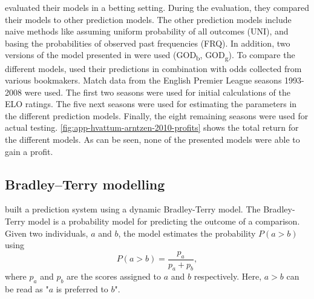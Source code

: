 \citet{bib:hvattum-arntzen-2010} evaluated their models in a betting setting. During the evaluation, they compared their models to other prediction models. The other prediction models include naive methods like assuming uniform probability of all outcomes (UNI), and basing the probabilities of observed past frequencies (FRQ). In addition, two versions of the model presented in \citet{bib:goddard-2005} were used (GOD\textsubscript{b}, GOD\textsubscript{g}). To compare the different models, \citet{bib:hvattum-arntzen-2010} used their predictions in combination with odds collected from various bookmakers. Match data from the English Premier League seasons 1993-2008 were used. The first two seasons were used for initial calculations of the ELO ratings. The five next seasons were used for estimating the parameters in the different prediction models. Finally, the eight remaining seasons were used for actual testing. \cref{fig:app-hvattum-arntzen-2010-profits} shows the total return for the different models. As can be seen, none of the presented models were able to gain a profit.

\subsection{Bradley–Terry modelling}

\citet{bib:cattelan-varin-firth-2013} built a prediction system using a dynamic Bradley-Terry model. The Bradley-Terry model is a probability model for predicting the outcome of a comparison. Given two individuals, $a$ and $b$, the model estimates the probability $P(a > b)$ using
\begin{equation}
    P(a > b) = \frac{p_{a}}{p_{a} + p_{b}},
    \label{eq:bradley-terry-model}
\end{equation}
where $p_{a}$ and $p_{b}$ are the scores assigned to $a$ and $b$ respectively. Here, $a > b$ can be read as "$a$ is preferred to $b$".

